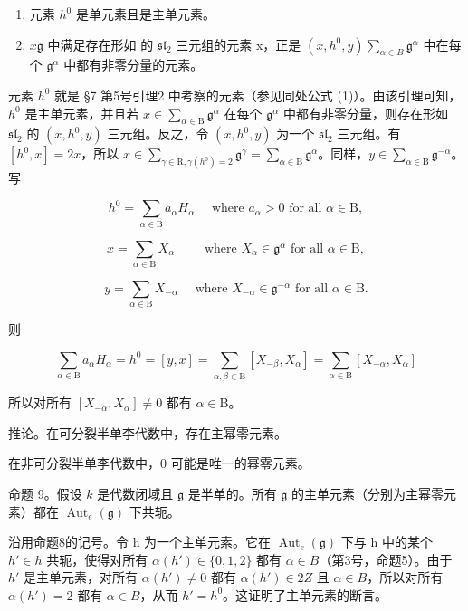 \begin{enumerate}
\def\labelenumi{(\roman{enumi})}
\item
  元素 \(h^0\) 是单元素且是主单元素。
\item
  \(x\)\(\mathfrak{g}\) 中满足存在形如  的 \(\mathfrak{sl}_2\) 三元组的元素 x，正是 \((x, h^0, y)\)\(\sum_{\alpha \in B} \mathfrak{g}^\alpha\) 中在每个 \(\mathfrak{g}^\alpha\) 中都有非零分量的元素。
\end{enumerate}

元素 \(h^0\) 就是 §7 第5号引理2 中考察的元素（参见同处公式 (1)）。由该引理可知，\(h^0\) 是主单元素，并且若 \(x \in \sum_{\alpha \in \mathrm{B}} \mathfrak{g}^\alpha\) 在每个 \(\mathfrak{g}^\alpha\) 中都有非零分量，则存在形如 \(\mathfrak{sl}_2\) 的 \((x, h^0, y)\) 三元组。反之，令 \((x, h^0, y)\) 为一个 \(\mathfrak{sl}_2\) 三元组。有 \([h^0, x] = 2x\)，所以 \(x \in \sum_{\gamma \in \mathrm{R}, \gamma(h^0) = 2} \mathfrak{g}^\gamma = \sum_{\alpha \in \mathrm{B}} \mathfrak{g}^\alpha\)。同样，\(y \in \sum_{\alpha \in \mathrm{B}} \mathfrak{g}^{-\alpha}\)。写

\[
h ^ {0} = \sum_ {\alpha \in \mathrm{B}} a _ {\alpha} H _ {\alpha} \quad \text { where } a _ {\alpha} > 0 \text { for all } \alpha \in \mathrm{B},
\]

\[
x = \sum_ {\alpha \in \mathrm{B}} X _ {\alpha} \qquad \text { where } X _ {\alpha} \in \mathfrak {g} ^ {\alpha} \text { for   all } \alpha \in \mathrm{B},
\]

\[
y = \sum_ {\alpha \in \mathrm{B}} X _ {- \alpha} \quad \text { where } X _ {- \alpha} \in \mathfrak {g} ^ {- \alpha} \text { for   all } \alpha \in \mathrm{B}.
\]

则

\[
\sum_ {\alpha \in \mathrm{B}} a _ {\alpha} H _ {\alpha} = h ^ {0} = [ y, x ] = \sum_ {\alpha , \beta \in \mathrm{B}} [ X _ {- \beta}, X _ {\alpha} ] = \sum_ {\alpha \in \mathrm{B}} [ X _ {- \alpha}, X _ {\alpha} ]
\]

所以对所有 \([X_{-\alpha}, X_{\alpha}] \neq 0\) 都有 \(\alpha \in \mathrm{B}\)。

推论。在可分裂半单李代数中，存在主幂零元素。

在非可分裂半单李代数中，0 可能是唯一的幂零元素。

命题 9。假设 \(k\) 是代数闭域且 \(\mathfrak{g}\) 是半单的。所有 \(\mathfrak{g}\) 的主单元素（分别为主幂零元素）都在 \(\operatorname{Aut}_e(\mathfrak{g})\) 下共轭。

沿用命题8的记号。令 h 为一个主单元素。它在 \(\operatorname{Aut}_{e}(\mathfrak{g})\) 下与 h 中的某个 \(h' \in h\) 共轭，使得对所有 \(\alpha(h') \in \{0,1,2\}\) 都有 \(\alpha \in B\)（第3号，命题5）。由于 \(h'\) 是主单元素，对所有 \(\alpha(h') \neq 0\) 都有 \(\alpha(h') \in 2Z\) 且 \(\alpha \in B\)，所以对所有 \(\alpha(h') = 2\) 都有 \(\alpha \in B\)，从而 \(h' = h^{0}\)。这证明了主单元素的断言。

